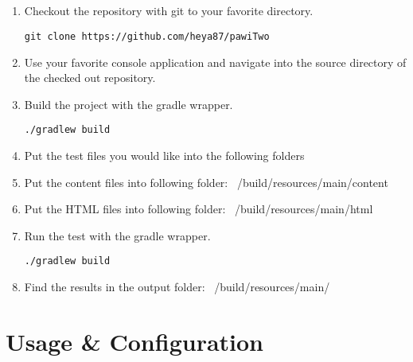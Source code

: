 \subsection{}
\begin{enumerate}

\item Checkout the repository with git to your favorite directory.
\begin{lstlisting}
git clone https://github.com/heya87/pawiTwo
\end{lstlisting}


\item Use your favorite console application and navigate into the source directory of the checked out repository.

\item Build the project with the gradle wrapper.
\begin{lstlisting}
./gradlew build
\end{lstlisting}



\item Put the test files you would like into the following folders

\item Put the content files into following folder: ~/build/resources/main/content
\item Put the HTML files into following folder: ~/build/resources/main/html
\item Run the test with the gradle wrapper.

\begin{lstlisting}
./gradlew build
\end{lstlisting}
\item Find the results in the output folder: ~/build/resources/main/


\end{enumerate}


\section{Usage \& Configuration}

